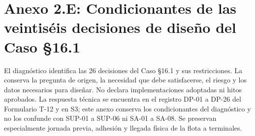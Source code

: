 \clearpage

\section*{Anexo 2.E: Condicionantes de las veintiséis decisiones de diseño del Caso §16.1}\label{sec:2-anexo-2e}

El diagnóstico identifica las 26 decisiones del Caso §16.1 y sus restricciones. La  conserva la pregunta de origen, la necesidad que debe satisfacerse, el riesgo y los datos necesarios para diseñar. No declara implementaciones adoptadas ni hitos aprobados. La respuesta técnica se encuentra en el registro DP-01 a DP-26 del Formulario T-12 y en S3; este anexo conserva los condicionantes del diagnóstico y no los confunde con SUP-01 a SUP-06 ni SA-01 a SA-08. Se preservan especialmente jornada previa, adhesión y llegada física de la flota a terminales.

